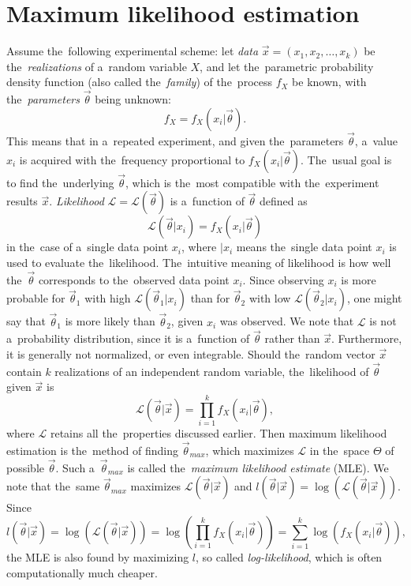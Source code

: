 \section{Maximum likelihood estimation} \label{ch:mle}

Assume the~following experimental scheme: let \textit{data} $\vec{x} = (x_1, x_2, \dots , x_k)$ be the~\textit{realizations} of a~random variable $X$, and let the~parametric probability density function (also called the~\textit{family}) of the~process $f_X$ be known, with the~\textit{parameters} $\vec{\theta}$ being unknown:
\begin{equation}
    f_X = f_X(x_i|\vec{\theta}). \label{eq:stat_experiment}
\end{equation}
This means that in a~repeated experiment, and given the~parameters $\vec{\theta}$, a~value $x_i$ is acquired with the~frequency proportional to $f_X(x_i|\vec{\theta})$. The~usual goal is to find the~underlying $\vec{\theta}$, which is the~most compatible with the~experiment results $\vec{x}$. \textit{Likelihood} $\mathcal{L}=\mathcal{L}(\vec{\theta})$ is a~function of $\vec{\theta}$ defined as 
\begin{equation}
    \mathcal{L}(\vec{\theta}|x_i) = f_X(x_i|\vec{\theta})
\end{equation}
in the~case of a~single data point $x_i$, where $|x_i$ means the~single data point $x_i$ is used to evaluate the~likelihood. The~intuitive meaning of likelihood is how well the~$\vec{\theta}$ corresponds to the~observed data point $x_i$. Since observing $x_i$ is more probable for $\vec{\theta}_1$ with high $\mathcal{L}(\vec{\theta}_1|x_i)$ than for $\vec{\theta}_2$ with low $\mathcal{L}(\vec{\theta}_2|x_i)$, one might say that $\vec{\theta}_1$ is more likely than $\vec{\theta}_2$, given $x_i$ was observed. We note that $\mathcal{L}$ is not a~probability distribution, since it is a~function of $\vec{\theta}$ rather than $\vec{x}$. Furthermore, it is generally not normalized, or even integrable. Should the~random vector $\vec{x}$ contain $k$ realizations of an independent random variable, the~likelihood of $\vec{\theta}$ given $\vec{x}$ is 
\begin{equation}
    \mathcal{L}(\vec{\theta}|\vec{x}) = \prod_{i=1}^k f_X(x_i|\vec{\theta}),
\end{equation}
where $\mathcal{L}$ retains all the~properties discussed earlier. Then maximum likelihood estimation is the~method of finding $\vec{\theta}_{max}$, which maximizes $\mathcal{L}$ in the~space $\Theta$ of possible $\vec{\theta}$. Such a~$\vec{\theta}_{max}$ is called the~\textit{maximum likelihood estimate} (MLE). We note that the~same $\vec{\theta}_{max}$ maximizes $\mathcal{L}(\vec{\theta}|\vec{x})$ and $l(\vec{\theta}|\vec{x}) = \log \left( \mathcal{L}(\vec{\theta}|\vec{x}) \right)$. Since 
\begin{equation}
    l(\vec{\theta}|\vec{x}) = \log \left( \mathcal{L}(\vec{\theta}|\vec{x}) \right) = \log \left( \prod_{i=1}^k f_X(x_i|\vec{\theta}) \right) =  \sum_{i=1}^k \log \left( f_X(x_i|\vec{\theta}) \right),
\end{equation}
the MLE is also found by maximizing $l$, so called \textit{log-likelihood}, which is often computationally much cheaper. 

